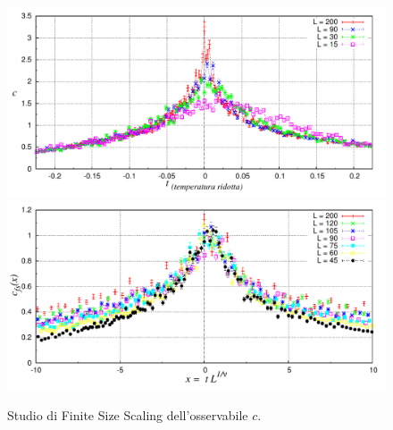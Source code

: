 \begin{figure}[htbp]
      \centering
      \caption[ParteD\_Ossvst.cpp $\;\rightarrow\;$ cvst\_file.p ]{Studio di Finite Size Scaling dell'osservabile $c$.}\label{fig: c_finitesize_1}
	\includegraphics[width=1\textwidth]{Immagini/ParteD/cvst}
	\bigskip
	\includegraphics[width=1\textwidth]{Immagini/ParteD/cvst_finite}
\end{figure}

